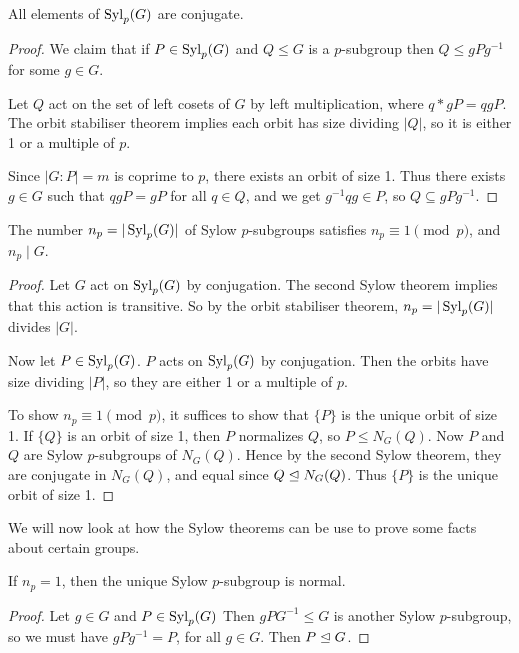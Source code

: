 \documentclass[a4paper]{scrartcl}
\begin{document}
\begin{theorem}
	All elements of $\operatorname{Syl}_p(G)$ are conjugate.
\end{theorem}
\begin{proof}
	We claim that if $P \in \operatorname{Syl}_p(G)$ and $Q \leq G$ is a $p$-subgroup then $Q \leq gPg^{-1}$ for some $g \in G$.
	
	Let $Q$ act on the set of left cosets of $G$ by left multiplication, where $q * gP = qgP$. The orbit stabiliser theorem implies each orbit has size dividing $|Q|$, so it is either 1 or a multiple of $p$. 

	Since $|G:P| = m$ is coprime to $p$, there exists an orbit of size 1. Thus there exists $g \in G$ such that $qgP = gP$ for all $q \in Q$, and we get $g^{-1}q g \in P$, so $Q \subseteq gPg^{-1}$.
\end{proof}

\begin{theorem}
	The number $n_p = |\operatorname{Syl}_p(G)|$ of Sylow $p$-subgroups satisfies $n_p \equiv 1 \pmod{p}$, and $n_p \mid G$. 
\end{theorem}
\begin{proof}
	Let $G$ act on $\operatorname{Syl}_p(G)$ by conjugation. The second Sylow theorem implies that this action is transitive. So by the orbit stabiliser theorem, $n_p = |\operatorname{Syl}_p(G)|$ divides $|G|$.

	Now let $P \in \operatorname{Syl}_p(G)$. $P$ acts on $\operatorname{Syl}_p(G)$ by conjugation. Then the orbits have size dividing $|P|$, so they are either 1 or a multiple of $p$.

	To show $n_p \equiv 1 \pmod{p}$, it suffices to show that $\{P\}$ is the unique orbit of size 1. If $\{Q\}$ is an orbit of size 1, then $P$ normalizes $Q$, so $P \leq N_G(Q)$. Now $P$ and $Q$ are Sylow $p$-subgroups of $N_G(Q)$. Hence by the second Sylow theorem, they are conjugate in $N_G(Q)$, and equal since $Q \trianglelefteq N_G(Q)$. Thus $\{P\}$ is the unique orbit of size 1.
\end{proof}



We will now look at how the Sylow theorems can be use to prove some facts about certain groups.

\begin{corollary}
	If $n_p = 1$, then the unique Sylow $p$-subgroup is normal.
\end{corollary}
\begin{proof}
Let $g \in G$ and $P \in \operatorname{Syl}_p(G)$ Then $gPG^{-1} \leq G$ is another Sylow $p$-subgroup, so we must have $gPg^{-1} = P$, for all $g \in G$. Then $P \trianglelefteq G$.
\end{proof}
\end{document}
